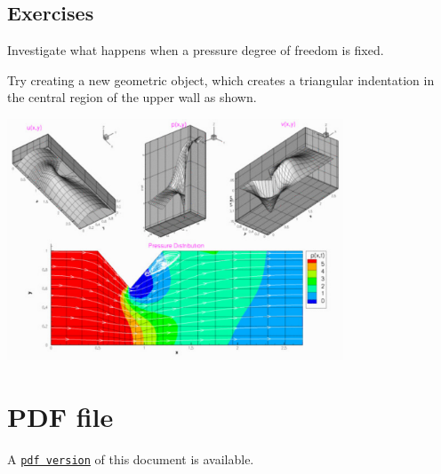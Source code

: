  

\hypertarget{index_exercises}{}\subsection{Exercises}\label{index_exercises}

\begin{DoxyEnumerate}
\item Investigate what happens when a pressure degree of freedom is fixed.
\item Try creating a new geometric object, which creates a triangular indentation in the central region of the upper wall as shown.
\end{DoxyEnumerate}

 
\begin{DoxyImage}
\includegraphics[width=0.75\textwidth]{Exercise}
\end{DoxyImage}




 

 \hypertarget{index_pdf}{}\section{P\+D\+F file}\label{index_pdf}
A \href{../latex/refman.pdf}{\tt pdf version} of this document is available. 
